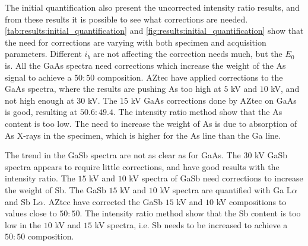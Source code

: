 The initial quantification also present the uncorrected intensity ratio results, and from these results it is possible to see what corrections are needed.
\cref{tab:results:initial_quantification} and \cref{fig:results:initial_quantification} show that the need for corrections are varying with both specimen and acquisition parameters.
Different $i_b$ are not affecting the correction needs much, but the $E_0$ is.
All the GaAs spectra need corrections which increase the weight of the As signal to achieve a $50:50$ composition.
AZtec have applied corrections to the GaAs spectra, where the results are pushing As too high at $5$ kV and $10$ kV, and not high enough at $30$ kV.
The $15$ kV GaAs corrections done by AZtec on GaAs is good, resulting at $50.6:49.4$.
The intensity ratio method show that the As content is too low.
The need to increase the weight of As is due to absorption of As X-rays in the specimen, which is higher for the As line than the Ga line.


The trend in the GaSb spectra are not as clear as for GaAs.
The $30$ kV GaSb spectra appears to require little corrections, and have good results with the intensity ratio.
The $15$ kV and $10$ kV spectra of GaSb need corrections to increase the weight of Sb.
The GaSb $15$ kV and $10$ kV spectra are quantified with Ga L$\alpha$ and Sb L$\alpha$.
AZtec have corrected the GaSb $15$ kV and $10$ kV compositions to values close to $50:50$.
The intensity ratio method show that the Sb content is too low in the $10$ kV and $15$ kV spectra, i.e. Sb needs to be increased to achieve a $50:50$ composition.


